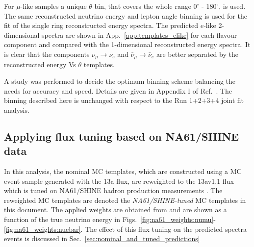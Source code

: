 For $\mu$-like samples a unique $\theta$ bin, that covers the whole range $0^{\circ}$ - $180^{\circ}$, is used.
The same reconstructed neutrino energy and lepton angle binning is used for the fit of the single ring reconstructed energy spectra.
The predicted $e$-like 2-dimensional spectra are shown in App.~\ref{app:templates_elike} for each flavour component
and compared with the 1-dimensional reconstructed energy spectra.
It is clear that the components $\nu_{\mu} \rightarrow \nu_e$ 
and $\bar{\nu}_{\mu} \rightarrow \bar{\nu}_e$ are better separated by the 
reconstructed energy Vs $\theta$ templates.

A study was performed to decide the optimum binning scheme balancing the needs for accuracy and speed.
Details are given in Appendix I of Ref.\ \cite{OurRun123DisappAnalysis3Flavour}. 
The binning described here is unchanged with respect to the Run 1+2+3+4 joint fit analysis.

\subsection {Applying flux tuning based on NA61/SHINE data}
\label{sec:na61_weights}

In this analysis, the nominal MC templates, which are constructed using a MC event sample generated with the 13a flux,
are reweighted to the 13av1.1 flux which is tuned on NA61/SHINE hadron production measurements \cite{FluxTuning13a}\cite{NA61/SHINET2K2014}.
The reweighted MC templates are denoted the {\em NA61/SHINE-tuned} MC templates in this document.
The applied weights are obtained from \cite{FluxTuning13a} and are shown as a function of the true neutrino energy 
in Figs.~\ref{fig:na61_weights:numu}-\ref{fig:na61_weights:nuebar}.
The effect of this flux tuning on the predicted spectra events is discussed in Sec.~\ref{sec:nominal_and_tuned_predictions} 

